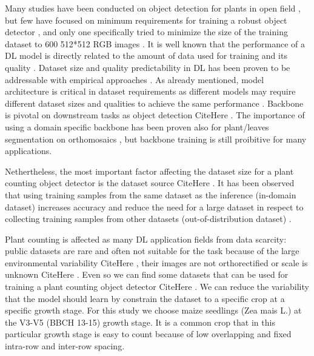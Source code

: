 \documentclass[journal,article,submit,pdftex,moreauthors]{Definitions/mdpi}
\begin{document}
Many studies have been conducted on object detection for plants in open field
\cite{barretoAutomaticUAVbasedCounting2021,gengResearchSegmentationMethod2024,jiangDeepSeedlingDeepConvolutional2019,katariIntegratingAutomatedLabeling2024,kitanoCornPlantCounting2019,liDCYOLOImprovedField2024,liSeedlingMaizeCounting2022,liuIntegrateNetDeepLearning2022,liuEstimatingMaizeSeedling2022,luTasselNetCountingMaize2017,macheferMaskRCNNRefitting2020,velumaniEstimatesMaizePlant2021,wangPlotLevelMaizeEarly2023,zhaoStudyLightweightModel2023},
but few have focused on minimum requirements for training a robust object detector
\cite{davidPlantDetectionCounting2021,andvaagCountingCanolaGeneralizable2024}, and only one
specifically tried to minimize the size of the training dataset to 600 512*512 RGB images \cite{karamiAutomaticPlantCounting2020}.
It is well known that the performance of a DL model is directly related to the
amount of data used for training \cite{sunRevisitingUnreasonableEffectiveness2017} and 
its quality \cite{alhazmiEffectsAnnotationQuality2021}.
Dataset size and quality predictability in DL has been proven to be
addressable with empirical approaches \cite{hestnessDeepLearningScaling2017,mahmoodHowMuchMore2022}.
As already mentioned, model architecture is critical in dataset requirements as different models may require
different dataset sizes and qualities to achieve the same performance \cite{nguyenEvaluationDeepLearning2020,brigatoCloseLookDeep2020}.
Backbone is pivotal on downstream tasks as object detection CiteHere . 
The importance of using a domain specific backbone has been proven also
for plant/leaves segmentation on orthomosaics \cite{roggiolaniDomainSpecificPreTraining2023},
but backbone training is still proibitive for many applications.

Nethertheless, the most important factor affecting the dataset size for a plant counting
object detector is the dataset source CiteHere . It has been observed that using training samples from the same
dataset as the inference (in-domain dataset) increases accuracy and reduce the need 
for a large dataset in respect to collecting training samples from other 
datasets (out-of-distribution dataset) \cite{davidPlantDetectionCounting2021,andvaagCountingCanolaGeneralizable2024}. 

Plant counting is affected as many DL application fields from data scarcity: public datasets
are rare and often not suitable for the task because of the large environmental
variability CiteHere , their images are not orthorectified or scale is unknown CiteHere . 
Even so we can find some datasets that can be used for training a plant counting object detector CiteHere .
We can reduce the variability that the model should learn by constrain the dataset
to a specific crop at a specific growth stage. For this study we choose maize seedlings
(Zea mais L.) at the V3-V5 (BBCH 13-15) growth stage. It is a common crop 
that in this particular growth stage is easy to count because of low overlapping
and fixed intra-row and inter-row spacing.
\end{document}

